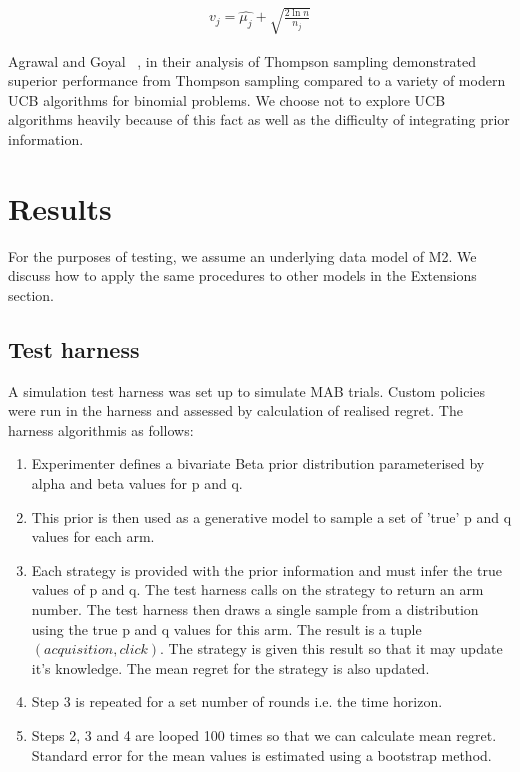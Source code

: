 \documentclass[11pt,a4,singlespacing,titlepagenumber=on]{scrreprt}
\numberwithin{equation}{chapter} %
\theoremstyle{remark}
\begin{document}
\begin{align}
v_j = \hat{\mu_j} + \sqrt{ \frac{2 \ln{n}}{n_j}  }
\end{align}

Agrawal and Goyal ~\cite{DBLP:journals/corr/abs-1111-1797}, in their analysis of Thompson sampling demonstrated superior performance from Thompson sampling compared to a variety of modern UCB algorithms for binomial problems. We choose not to explore UCB algorithms heavily because of this fact as well as the difficulty of integrating prior information.

\chapter{ Results }

For the purposes of testing, we assume an underlying data model of M2. We discuss how to apply the same procedures to other models in the Extensions section.

\section{Test harness}

A simulation test harness was set up to simulate MAB trials. Custom policies were run in the harness and assessed by calculation of realised regret. The harness algorithmis as follows:

\begin{enumerate}
	\item Experimenter defines a bivariate Beta prior distribution parameterised by alpha and beta values for p and q.
	\item This prior is then used as a generative model to sample a set of 'true' p and q values for each arm.
	\item Each strategy is provided with the prior information and must infer the true values of p and q. The test harness calls on the strategy to return an arm number. The test harness then draws a single sample from a distribution using the true p and q values for this arm. The result is a tuple $(acquisition,click)$. The strategy is given this result so that it may update it's knowledge. The mean regret for the strategy is also updated.
	\item Step 3 is repeated for a set number of rounds i.e. the time horizon.
	\item Steps 2, 3 and 4 are looped 100 times so that we can calculate mean regret. Standard error for the mean values is estimated using a bootstrap method.
\end{enumerate}
\end{document}

